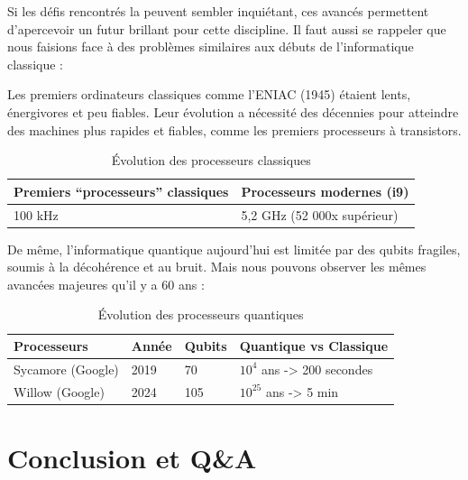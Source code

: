 \documentclass{article}
\begin{document}
Si les défis rencontrés la peuvent sembler inquiétant, ces avancés permettent d'apercevoir un futur brillant pour cette discipline. Il faut aussi se rappeler que nous faisions face à des problèmes similaires aux débuts de l’informatique classique :  

Les premiers ordinateurs classiques comme l'ENIAC (1945) étaient lents, énergivores et peu fiables. Leur évolution a nécessité des décennies pour atteindre des machines plus rapides et fiables, comme les premiers processeurs à transistors. 

\begin{table}[H]
\centering
\begin{tabular}{|l|l|}
  \hline
  \textbf{Premiers “processeurs” classiques} & \textbf{Processeurs modernes (i9)} \\
  \hline
  100 kHz & 5,2 GHz (52 000x supérieur) \\
  \hline
\end{tabular}
\caption{Évolution des processeurs classiques}
\end{table}

De même, l’informatique quantique aujourd'hui est limitée par des qubits fragiles, soumis à la décohérence et au bruit. Mais nous pouvons observer les mêmes avancées majeures qu’il y a 60 ans : 

\begin{table}[H]
\centering
\begin{tabular}{|l|l|l|l|}
  \hline
  \textbf{Processeurs} & \textbf{Année} & \textbf{Qubits} & \textbf{Quantique vs Classique} \\
  \hline
  Sycamore (Google) & 2019 & 70 & $10^4$ ans -> 200 secondes \\
  Willow (Google) & 2024 & 105 & $10^{25}$ ans -> 5 min \\
  \hline
\end{tabular}
\caption{Évolution des processeurs quantiques}
\end{table}

\cite{googleWillow} \cite{wikipediaSycamore} \cite{wikipediaQProcessors}

\break\section{Conclusion et Q\&A}
\end{document}
